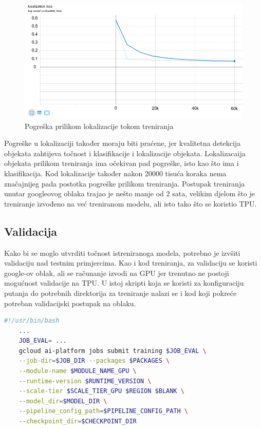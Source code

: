 \begin{figure}[htb]
    \centering
    \includegraphics[width=12cm]{img/local-loss.png}
    \caption{Pogreška prilikom lokalizacije tokom treniranja}
    \label{Local-Loss}
\end{figure}

Pogreške u lokalizaciji također moraju biti praćene, jer kvalitetna detekcija objekata zahtijeva točnost i klasifikacije i lokalizacije objekata. Lokalizacaija objekata prilikom treniranja
ima očekivan pad pogreške, isto kao što ima i klasifikacija. Kod lokalizacije također nakon 20000 tisuća koraka nema značajnijeg pada postotka pogreške prilikom treniranja. 
Postupak treniranja unutar googleovog oblaka trajao je nešto manje od 2 sata, velikim djelom što je treniranje izvođeno na već treniranom modelu, ali isto tako što se koristio TPU. 

\subsection{Validacija}
Kako bi se moglo utvrditi točnost istreniranoga modela, potrebno je izvšiti validaciju nad testnim primjercima. Kao i kod treniranja, za validaciju se koristi google-ov oblak, ali se računanje izvodi
na GPU jer trenutno ne postoji mogućnost validacije na TPU. U istoj skripti koja se koristi za konfiguraciju putanja do potrebnih direktorija za treniranje nalazi se i kod koji pokreće potreban validacijski
postupak na oblaku. 

\begin{lstlisting}[language=bash, tabsize=2]
    #!/usr/bin/bash
    ...
    JOB_EVAL= ...
    gcloud ai-platform jobs submit training $JOB_EVAL \
    --job-dir=$JOB_DIR --packages $PACKAGES \
    --module-name $MODULE_NAME_GPU \
    --runtime-version $RUNTIME_VERSION \
    --scale-tier $SCALE_TIER_GPU $REGION $BLANK \
    --model_dir=$MODEL_DIR \
    --pipeline_config_path=$PIPELINE_CONFIG_PATH \
    --checkpoint_dir=$CHECKPOINT_DIR
\end{lstlisting}

